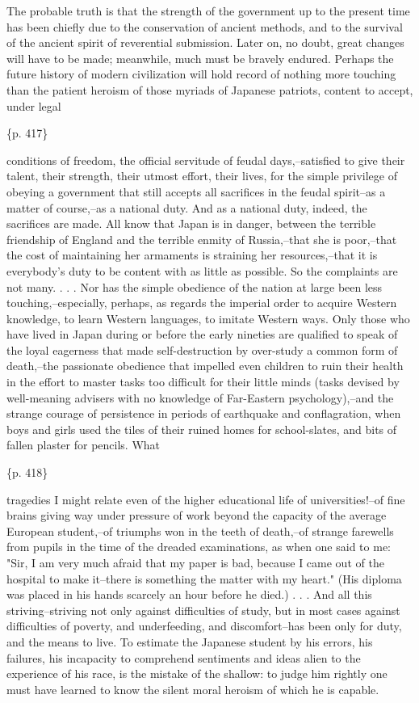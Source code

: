The probable truth is that the strength of the government up to the present time has been chiefly due to the conservation of ancient methods, and to the survival of the ancient spirit of reverential submission. Later on, no doubt, great changes will have to be made; meanwhile, much must be bravely endured. Perhaps the future history of modern civilization will hold record of nothing more touching than the patient heroism of those myriads of Japanese patriots, content to accept, under legal

\{p. 417\}

conditions of freedom, the official servitude of feudal days,--satisfied to give their talent, their strength, their utmost effort, their lives, for the simple privilege of obeying a government that still accepts all sacrifices in the feudal spirit--as a matter of course,--as a national duty. And as a national duty, indeed, the sacrifices are made. All know that Japan is in danger, between the terrible friendship of England and the terrible enmity of Russia,--that she is poor,--that the cost of maintaining her armaments is straining her resources,--that it is everybody's duty to be content with as little as possible. So the complaints are not many. . . . Nor has the simple obedience of the nation at large been less touching,--especially, perhaps, as regards the imperial order to acquire Western knowledge, to learn Western languages, to imitate Western ways. Only those who have lived in Japan during or before the early nineties are qualified to speak of the loyal eagerness that made self-destruction by over-study a common form of death,--the passionate obedience that impelled even children to ruin their health in the effort to master tasks too difficult for their little minds (tasks devised by well-meaning advisers with no knowledge of Far-Eastern psychology),--and the strange courage of persistence in periods of earthquake and conflagration, when boys and girls used the tiles of their ruined homes for school-slates, and bits of fallen plaster for pencils. What

\{p. 418\}

tragedies I might relate even of the higher educational life of universities!--of fine brains giving way under pressure of work beyond the capacity of the average European student,--of triumphs won in the teeth of death,--of strange farewells from pupils in the time of the dreaded examinations, as when one said to me: "Sir, I am very much afraid that my paper is bad, because I came out of the hospital to make it--there is something the matter with my heart." (His diploma was placed in his hands scarcely an hour before he died.) . . . And all this striving--striving not only against difficulties of study, but in most cases against difficulties of poverty, and underfeeding, and discomfort--has been only for duty, and the means to live. To estimate the Japanese student by his errors, his failures, his incapacity to comprehend sentiments and ideas alien to the experience of his race, is the mistake of the shallow: to judge him rightly one must have learned to know the silent moral heroism of which he is capable.

